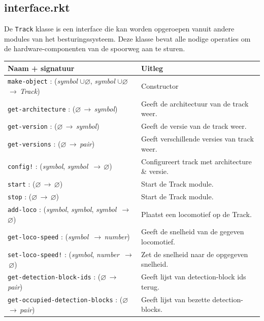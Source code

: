 \documentclass[a4paper, 11pt]{article}
\newcommand{\naar}{\,$\rightarrow$\,}
\renewcommand{\empty}{$\varnothing$}
\newcommand{\of}{$\cup$\;}
\newcommand{\<}{\scriptsize\textless\normalsize}
\renewcommand{\>}{\scriptsize\textgreater\normalsize}
\begin{document}
\subsection{interface.rkt} %
De \texttt{Track} klasse is een interface die kan worden opgeroepen vanuit andere modules van het besturingssysteem. Deze klasse bevat alle nodige operaties om de hardware-componenten van de spoorweg aan te sturen.
\begin{table}[H]
	\begin{center}
		{
		\begin{tabular}{|l l|}
			\hline
			\textbf{Naam + signatuur} & \textbf{Uitleg}\\
			\hline
			\texttt{make-object} : (\textit{symbol} \of \empty, \textit{symbol} \of \empty \naar \textit{Track}) & Constructor\\
			\hline
			\texttt{get-architecture} : (\empty \naar \textit{symbol}) & Geeft de architectuur van de track weer.\\
			\texttt{get-version} : (\empty \naar \textit{symbol}) & Geeft de versie van de track weer.\\
			\texttt{get-versions} : (\empty \naar \textit{pair}) & Geeft verschillende versies van track weer.\\
			\texttt{config!} : (\textit{symbol}, \textit{symbol} \naar \empty) & Configureert track met architecture \& versie.\\
			\texttt{start} : (\empty \naar \empty) & Start de Track module.\\
			\texttt{stop} : (\empty \naar \empty) & Start de Track module.\\
			\texttt{add-loco} : (\textit{symbol}, \textit{symbol}, \textit{symbol} \naar \empty) & Plaatst een locomotief op de Track.\\
			\texttt{get-loco-speed} : (\textit{symbol} \naar \textit{number}) & Geeft de snelheid van de gegeven locomotief.\\
			\texttt{set-loco-speed!} : (\textit{symbol}, \textit{number} \naar \empty) & Zet de snelheid naar de opgegeven snelheid.\\
			\texttt{get-detection-block-ids} : (\empty \naar \textit{pair}) & Geeft lijst van detection-block ids terug.\\
			\texttt{get-occupied-detection-blocks} : (\empty \naar \textit{pair}) & Geeft lijst van bezette detection-blocks.\\

\end{tabular}}
\end{center}
\end{table}
\end{document}
